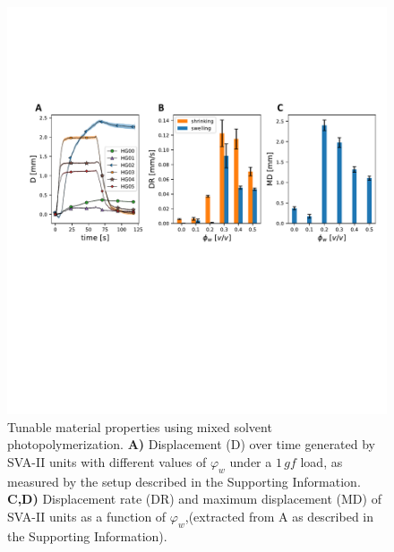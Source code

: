 \begin{figure}[!ht]
\centering
\includegraphics[width=\textwidth]{forcedisp.pdf}
\caption[The effect of $\varphi_w$ on mechanical properties]{Tunable material properties using mixed solvent photopolymerization.
\textbf{A)} Displacement (D) over time generated by SVA-II units with different values of \(\varphi_{w}\)  under a $1\,gf$ load, as measured by the setup described in the Supporting Information. \textbf{C,D)} Displacement rate (DR) and maximum displacement (MD) of SVA-II units as a function of $\varphi_w$,(extracted from A as described in the Supporting Information).}
\label{fig:forcedisp}
\end{figure}

